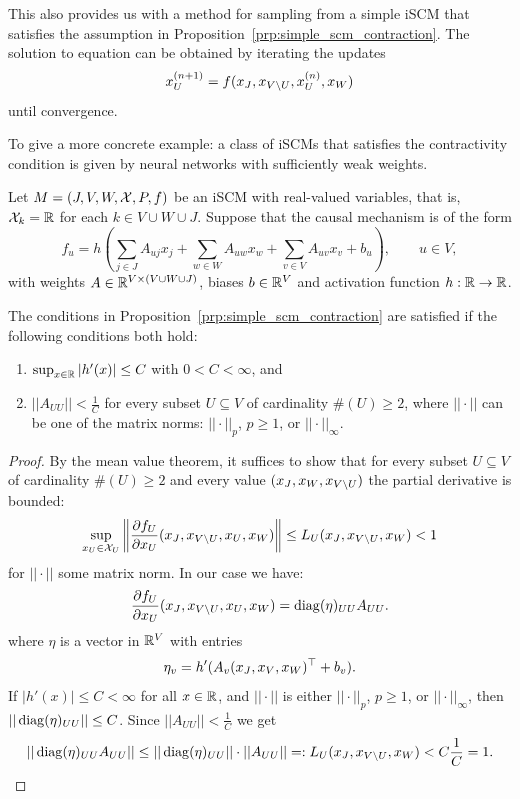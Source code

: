 \begin{Rem}
  This also provides us with a method for sampling from a simple iSCM that satisfies the assumption in Proposition~\ref{prp:simple_scm_contraction}. The solution to equation  
can be obtained by iterating the updates
  $$x_U^{(n+1)} = f(x_{J},x_{V\setminus U},x_U^{(n)},x_{W})$$
until convergence.
\end{Rem}

To give a more concrete example: a class of iSCMs that satisfies the contractivity condition is given by neural networks with sufficiently weak weights.
\begin{Eg}
  Let $M = \left ( J, V, W, \mathcal{X}, P, f \right )$ be an iSCM with real-valued variables, that is, $\mathcal{X}_k = \mathbb{R}$ for each $k \in V \cup W \cup J$.
  Suppose that the causal mechanism is of the form
  $$f_u = h\left(\sum_{j \in J} A_{uj} x_j + \sum_{w \in W} A_{uw} x_w + \sum_{v \in V} A_{uv} x_v + b_u\right),\qquad u\in V,$$
  with weights $A \in \mathbb{R}^{V \times (V \cup W \cup J)}$, biases $b \in \mathbb{R}^V$ and activation function $h : \mathbb{R} \to \mathbb{R}$.

  The conditions in Proposition~\ref{prp:simple_scm_contraction} are satisfied if the following conditions both hold:
\begin{enumerate}
  \item $\sup_{x\in\mathbb{R}}|h'(x)| \le C $ with $0 < C < \infty$, and
  \item $|| A_{UU} || < \frac{1}{C}$ for every subset $U \subseteq V$ of cardinality $\#(U) \ge 2$, where $||\cdot||$ can be one of the matrix norms: $||\cdot||_p$, $p \ge 1$, or $||\cdot||_\infty$.
\end{enumerate}
\end{Eg}
\begin{proof}
  By the mean value theorem, it suffices to show that for every subset $U \subseteq V$ of cardinality $\#(U) \ge 2$ and every value $(x_J,x_W,x_{V\setminus U})$ the partial derivative is bounded:
  \[ \sup_{x_U\in \mathcal{X}_U} \left\lVert \frac{\partial f_U}{\partial x_U} (x_{J},x_{V\setminus U},x_U,x_{W}) \right\rVert \le L_U(x_{J},x_{V\setminus U},x_{W}) < 1  \]
for $||\cdot||$ some matrix norm. In our case we have: 
  $$\frac{\partial f_U}{\partial x_U} (x_{J},x_{V\setminus U},x_U,x_{W}) = \operatorname*{\mathrm{diag}}(\eta)_{UU} A_{UU}.$$ 
where $\eta$ is a vector in $\mathbb{R}^V$ with entries
  $$\eta_{v} = h'(A_v (x_{J},x_{V},x_{W})^\top + b_v).$$
If $|h'(x)| \le C < \infty$ for all $x \in \mathbb{R}$, and $||\cdot||$ is either $||\cdot||_p$, $p \ge 1$, or $||\cdot||_\infty$, then $||\operatorname*{\mathrm{diag}}(\eta)_{UU}|| \le C$.
Since $||A_{UU}|| < \frac{1}{C}$ we get
  $$|| \operatorname*{\mathrm{diag}}(\eta)_{UU} A_{UU} || \le ||\operatorname*{\mathrm{diag}}(\eta)_{UU}|| \cdot ||A_{UU}|| =: L_U(x_{J},x_{V\setminus U},x_{W}) < C \frac{1}{C} = 1.$$
\end{proof}

